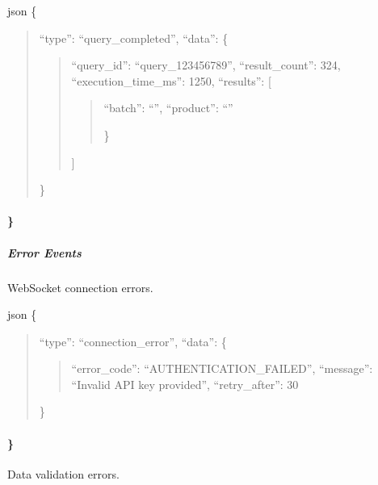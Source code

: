 \documentclass[letterpaper,10pt,english]{sphinxmanual}
\begin{document}
\sphinxAtStartPar
{\color{red}\bfseries{}\textasciigrave{}\textasciigrave{}}{\color{red}\bfseries{}\textasciigrave{}}json
\{
\begin{quote}

\sphinxAtStartPar
“type”: “query\_completed”,
“data”: \{
\begin{quote}

\sphinxAtStartPar
“query\_id”: “query\_123456789”,
“result\_count”: 324,
“execution\_time\_ms”: 1250,
“results”: {[}
\begin{quote}
\begin{description}
\sphinxlineitem{\{}
\sphinxAtStartPar
“batch”: “”,
“product”: “”

\end{description}

\sphinxAtStartPar
\}
\end{quote}

\sphinxAtStartPar
{]}
\end{quote}

\sphinxAtStartPar
\}
\end{quote}


\paragraph{\}}
\label{\detokenize{api/websocket-api:id45}}

\subparagraph{Error Events}
\label{\detokenize{api/websocket-api:error-events}}
\sphinxAtStartPar
{}
WebSocket connection errors.

\sphinxAtStartPar
{\color{red}\bfseries{}\textasciigrave{}\textasciigrave{}}{\color{red}\bfseries{}\textasciigrave{}}json
\{
\begin{quote}

\sphinxAtStartPar
“type”: “connection\_error”,
“data”: \{
\begin{quote}

\sphinxAtStartPar
“error\_code”: “AUTHENTICATION\_FAILED”,
“message”: “Invalid API key provided”,
“retry\_after”: 30
\end{quote}

\sphinxAtStartPar
\}
\end{quote}


\paragraph{\}}
\label{\detokenize{api/websocket-api:id50}}
\sphinxAtStartPar
{}
Data validation errors.
\end{document}
